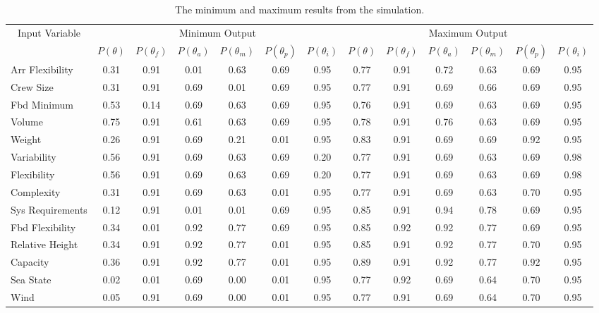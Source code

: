 \documentclass{svproc}
\begin{document}
\begin{table}[!htb]
\begin{adjustwidth}{-0.5cm}{-.5cm}
\begin{center}
\caption{The minimum and maximum results from the simulation.}
\begin{tabular}{l | c c c c c c | c c c c c c}
\hline
\multicolumn{1}{c}{Input Variable} & \multicolumn{6}{c}{Minimum Output}         &      \multicolumn{6}{c}{Maximum Output} \\
& $P(\theta)$ & $P(\theta_f)$ & $P(\theta_a)$ & $P(\theta_m)$ & $P(\theta_p)$ & $P(\theta_i)$  & $P(\theta)$& $P(\theta_f)$ & $P(\theta_a)$ & $P(\theta_m)$ & $P(\theta_p)$ & $P(\theta_i)$ \\
\hline
Arr Flexibility & 0.31 & 0.91 & 0.01 & 0.63 & 0.69 & 0.95           & 0.77 & 0.91 & 0.72 & 0.63 & 0.69 & 0.95 \\
Crew Size               & 0.31 & 0.91 & 0.69 & 0.01 & 0.69 & 0.95           & 0.77 & 0.91 & 0.69 & 0.66 & 0.69 & 0.95 \\
Fbd Minimum       & 0.53 & 0.14 & 0.69 & 0.63 & 0.69 & 0.95           & 0.76 & 0.91 & 0.69 & 0.63 & 0.69 & 0.95 \\
Volume                  & 0.75 & 0.91 & 0.61 & 0.63 & 0.69 & 0.95           & 0.78 & 0.91 & 0.76 & 0.63 & 0.69 & 0.95 \\
Weight                  & 0.26 & 0.91 & 0.69 & 0.21 & 0.01 & 0.95           & 0.83 & 0.91 & 0.69 & 0.69 & 0.92 & 0.95 \\
Variability             & 0.56 & 0.91 & 0.69 & 0.63 & 0.69 & 0.20           & 0.77 & 0.91 & 0.69 & 0.63 & 0.69 & 0.98 \\
Flexibility             & 0.56 & 0.91 & 0.69 & 0.63 & 0.69 & 0.20           & 0.77 & 0.91 & 0.69 & 0.63 & 0.69 & 0.98 \\
Complexity              & 0.31 & 0.91 & 0.69 & 0.63 & 0.01 & 0.95           & 0.77 & 0.91 & 0.69 & 0.63 & 0.70 & 0.95 \\
Sys Requirements     & 0.12 & 0.91 & 0.01 & 0.01 & 0.69 & 0.95           & 0.85 & 0.91 & 0.94 & 0.78 & 0.69 & 0.95 \\
Fbd Flexibility   & 0.34 & 0.01 & 0.92 & 0.77 & 0.69 & 0.95           & 0.85 & 0.92 & 0.92 & 0.77 & 0.69 & 0.95 \\
Relative Height         & 0.34 & 0.91 & 0.92 & 0.77 & 0.01 & 0.95           & 0.85 & 0.91 & 0.92 & 0.77 & 0.70 & 0.95 \\
Capacity                & 0.36 & 0.91 & 0.92 & 0.77 & 0.01 & 0.95           & 0.89 & 0.91 & 0.92 & 0.77 & 0.92 & 0.95 \\
Sea State               & 0.02 & 0.01 & 0.69 & 0.00 & 0.01 & 0.95           & 0.77 & 0.92 & 0.69 & 0.64 & 0.70 & 0.95 \\
Wind                    & 0.05 & 0.91 & 0.69 & 0.00 & 0.01 & 0.95           & 0.77 & 0.91 & 0.69 & 0.64 & 0.70 & 0.95 \\
\hline
\end{tabular}
\label{table:min_max}
\end{center}
\end{adjustwidth} 
\end{table}
\end{document}
